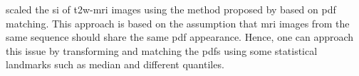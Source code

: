 \begin{enumerate}[leftmargin=*]
\cite{Lv2009} scaled the \ac{si} of \ac{t2w}-\ac{mri} images using the method proposed by \cite{Nyul2000} based on \ac{pdf} matching. This approach is based on the assumption that \ac{mri} images from the same sequence should share the same \ac{pdf} appearance. Hence, one can approach this issue by transforming and matching the \acp{pdf} using some statistical landmarks such as median and different quantiles.%
%
%
%
%
%

\end{enumerate}
